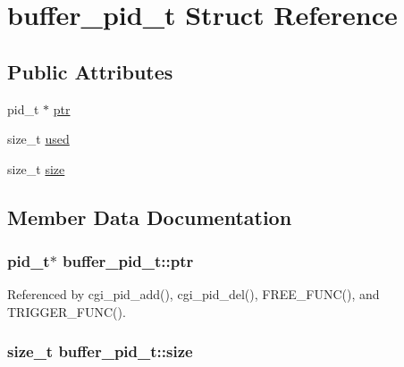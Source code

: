\hypertarget{structbuffer__pid__t}{\section{buffer\-\_\-pid\-\_\-t Struct Reference}
\label{structbuffer__pid__t}
}
\subsection*{Public Attributes}
\begin{DoxyCompactItemize}
\item 
pid\-\_\-t $\ast$ \hyperlink{structbuffer__pid__t_a85900d3b42b20986fa83168fdb00b14b}{ptr}
\item 
size\-\_\-t \hyperlink{structbuffer__pid__t_a33a6b172db9974830ceb613918712bc8}{used}
\item 
size\-\_\-t \hyperlink{structbuffer__pid__t_abee0c32c23f8a78fc7c0ce7f95ccf838}{size}
\end{DoxyCompactItemize}


\subsection{Member Data Documentation}
\hypertarget{structbuffer__pid__t_a85900d3b42b20986fa83168fdb00b14b}{
\subsubsection[{ptr}]{\setlength{\rightskip}{0pt plus 5cm}pid\-\_\-t$\ast$ buffer\-\_\-pid\-\_\-t\-::ptr}}\label{structbuffer__pid__t_a85900d3b42b20986fa83168fdb00b14b}


Referenced by cgi\-\_\-pid\-\_\-add(), cgi\-\_\-pid\-\_\-del(), F\-R\-E\-E\-\_\-\-F\-U\-N\-C(), and T\-R\-I\-G\-G\-E\-R\-\_\-\-F\-U\-N\-C().

\hypertarget{structbuffer__pid__t_abee0c32c23f8a78fc7c0ce7f95ccf838}{
\subsubsection[{size}]{\setlength{\rightskip}{0pt plus 5cm}size\-\_\-t buffer\-\_\-pid\-\_\-t\-::size}}\label{structbuffer__pid__t_abee0c32c23f8a78fc7c0ce7f95ccf838}



